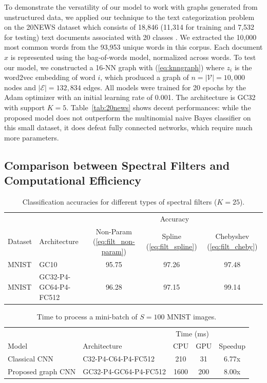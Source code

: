 \documentclass{article}
\newcommand{\V}{\mathcal{V}}
\newcommand{\E}{\mathcal{E}}
\newcommand{\tabref}[1]{Table~\ref{tab:#1}}
\newcommand{\eqnref}[1]{(\ref{eq:#1})}
\newcommand{\todo}[1]{{\color{red} #1 }}
\begin{document}
To demonstrate the versatility of our model to work with graphs generated from
unstructured data, we applied our technique to the text categorization problem
on the 20NEWS dataset which consists of 18,846 (11,314 for training and 7,532
for testing) text documents associated with 20 classes
\cite{art:Joachims9620NEWS}. We extracted the 10,000 most common words from the
93,953 unique words in this corpus. Each document $x$ is represented using the
bag-of-words model, normalized across words. To test our model, we constructed
a 16-NN graph with \eqnref{knngraph} where $z_i$ is the word2vec embedding
\cite{pro:MikolovChenCorradoDean13word2vec} of word $i$, which produced a graph
of $n = |\V| = 10,000$ nodes and $|\E| = 132,834$ edges. All models were
trained for 20 epochs by the Adam optimizer \cite{art:KingmaBa14AdamOpt} with
an initial learning rate of 0.001. The architecture is GC32 with support $K =
5$. \tabref{20news} shows decent performances: while the proposed model does
not outperform the multinomial naive Bayes classifier on this small dataset, it
does defeat fully connected networks, which require much more parameters.


\subsection{Comparison between Spectral Filters and Computational Efficiency}

\begin{table}[t!] \centering
\begin{tabular}{llccc} \toprule
& & \multicolumn{3}{c}{Accuracy} \\
\cmidrule{3-5}
Dataset & Architecture & Non-Param \eqnref{filt_non-param} &
Spline \eqnref{filt_spline} \cite{art:BrunaZarembaSzlamLeCun13DLgraphs} &
Chebyshev \eqnref{filt_cheby} \\
\midrule
MNIST & GC10 & 95.75 & 97.26 & {97.48} \\
MNIST & GC32-P4-GC64-P4-FC512 & 96.28 & 97.15 & {99.14} \\
\bottomrule \end{tabular}
\caption{Classification accuracies for different types of spectral filters
($K=25$).} %
\label{tab:filters}
\end{table}

\begin{table}[t]
\centering
\begin{tabular}{llccc} \toprule
& & \multicolumn{2}{c}{Time (ms)} & \\
Model & Architecture & CPU & GPU & Speedup \\ %
\midrule
Classical CNN & C32-P4-C64-P4-FC512 & 210 & 31 & 6.77x \\
Proposed graph CNN & GC32-P4-GC64-P4-FC512 & 1600 & 200 & 8.00x \\
\bottomrule \end{tabular}
\caption{Time to process a mini-batch of $S=100$ MNIST images.} 
\label{tab:speedup}
\end{table}
\end{document}
